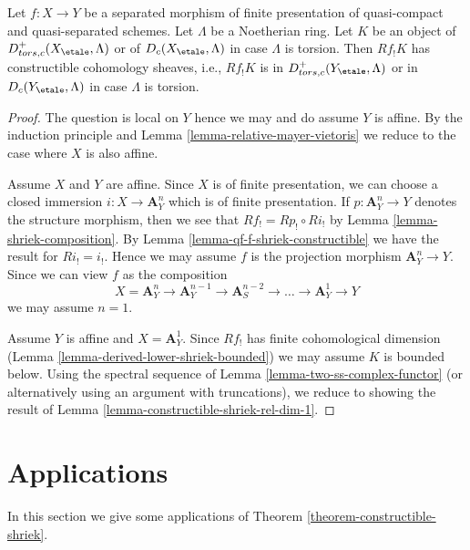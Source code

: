 \begin{theorem}
\label{theorem-constructible-shriek}
Let $f : X \to Y$ be a separated morphism of finite presentation
of quasi-compact and quasi-separated schemes. Let $\Lambda$ be a
Noetherian ring. Let $K$ be an object of $D^+_{tors, c}(X_\etale, \Lambda)$
or of $D_c(X_\etale, \Lambda)$ in case $\Lambda$ is torsion.
Then $Rf_!K$ has constructible cohomology sheaves, i.e.,
$Rf_!K$ is in $D^+_{tors, c}(Y_\etale, \Lambda)$
or in $D_c(Y_\etale, \Lambda)$ in case $\Lambda$ is torsion.
\end{theorem}

\begin{proof}
The question is local on $Y$ hence we may and do assume $Y$ is affine.
By the induction principle and Lemma \ref{lemma-relative-mayer-vietoris}
we reduce to the case where $X$ is also affine.

\medskip\noindent
Assume $X$ and $Y$ are affine. Since $X$ is of finite presentation,
we can choose a closed immersion $i : X \to \mathbf{A}^n_Y$ which is
of finite presentation. If $p : \mathbf{A}^n_Y \to Y$ denotes
the structure morphism, then we see that $Rf_! = Rp_! \circ Ri_!$
by Lemma \ref{lemma-shriek-composition}. By
Lemma \ref{lemma-qf-f-shriek-constructible}
we have the result for $Ri_! = i_!$. Hence we may assume $f$
is the projection morphism $\mathbf{A}^n_Y \to Y$.
Since we can view $f$ as the composition
$$
X = \mathbf{A}^n_Y \to \mathbf{A}^{n - 1}_Y \to
\mathbf{A}^{n - 2}_S \to \ldots \to
\mathbf{A}^1_Y \to Y
$$
we may assume $n = 1$.

\medskip\noindent
Assume $Y$ is affine and $X = \mathbf{A}^1_Y$. Since $Rf_!$ has
finite cohomological dimension
(Lemma \ref{lemma-derived-lower-shriek-bounded})
we may assume $K$ is bounded below. Using the spectral sequence of
Lemma \ref{lemma-two-ss-complex-functor}
(or alternatively using an argument with truncations),
we reduce to showing the result of
Lemma \ref{lemma-constructible-shriek-rel-dim-1}.
\end{proof}








\section{Applications}
\label{section-applications}

\noindent
In this section we give some applications of
Theorem \ref{theorem-constructible-shriek}.

